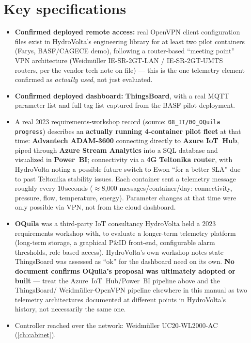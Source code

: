 \documentclass[a4paper,11pt,twoside,openright,numbers=noenddot]{scrreprt}
\begin{document}
\section{Key specifications}
\begin{itemize}
\item \textbf{Confirmed deployed remote access:} real OpenVPN client
  configuration files exist in HydroVolta's engineering library for at
  least two pilot containers (Farys, BASF/CAGECE demo), following a
  router-based \enquote{meeting point} VPN architecture (Weidm\"uller
  IE-SR-2GT-LAN / IE-SR-2GT-UMTS routers, per the vendor tech note on
  file) --- this is the one telemetry element confirmed as \emph{actually
  used}, not just evaluated.
\item \textbf{Confirmed deployed dashboard:} \textbf{ThingsBoard}, with a
  real MQTT parameter list and full tag list captured from the BASF pilot
  deployment.
\item A real 2023 requirements-workshop record (source:
  \texttt{08\_IT/00\_OQuila progress}) describes an \textbf{actually
  running 4-container pilot fleet} at that time: \textbf{Advantech
  ADAM-3600} connecting directly to \textbf{Azure IoT~Hub}, piped through
  \textbf{Azure Stream Analytics} into a SQL database and visualized in
  \textbf{Power~BI}; connectivity via a \textbf{4G Teltonika router}, with
  HydroVolta noting a possible future switch to Ewon \enquote{for a
  better SLA} due to past Teltonika stability issues. Each container sent
  a telemetry message roughly every 10\,seconds ($\approx$8{,}000
  messages/container/day: connectivity, pressure, flow, temperature,
  energy). Parameter changes at that time were only possible via VPN, not
  from the cloud dashboard.
\item \textbf{OQuila} was a third-party IoT consultancy HydroVolta held a
  2023 requirements workshop with, to evaluate a longer-term telemetry
  platform (long-term storage, a graphical P\&ID front-end, configurable
  alarm thresholds, role-based access). HydroVolta's own workshop notes
  state ThingsBoard was assessed as \enquote{ok} for the dashboard need on
  its own. \textbf{No document confirms OQuila's proposal was ultimately
  adopted or built} --- treat the Azure~IoT~Hub/Power~BI pipeline above
  and the ThingsBoard/ Weidm\"uller-OpenVPN pipeline elsewhere in this
  manual as two telemetry architectures documented at different points in
  HydroVolta's history, not necessarily the same one.
\item Controller reached over the network: Weidm\"uller UC20-WL2000-AC
  (\cref{ch:cabinet}).
\end{itemize}
\end{document}
